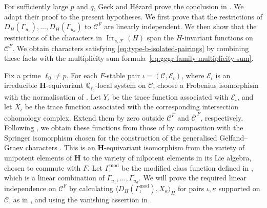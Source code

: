 \documentclass[10pt]{amsart}
\theoremstyle{definition}
\let\oldendproof\endproof
\renewenvironment{proof}[1][\proofname]{%
  \oldproof[\bfseries #1]%
}{\oldendproof}
\DeclareMathOperator{\Irr}{Irr}
\numberwithin{equation}{section}
\numberwithin{table}{section}
\begin{document}
\begin{proof}[Proof of Lemma~\ref{lem:type-b-isolated-coverage}]
For sufficiently large $p$ and $q$, Geck and H\'ezard prove the
conclusion in \cite[Proposition~4.3]{GeckHezard2008}. We adapt their
proof to the present hypotheses.
We first prove that the restrictions of
$D_H(\Gamma_{u_1}),\ldots,D_H(\Gamma_{u_d})$ to $\mathcal C^F$
are linearly independent. We then show that the restrictions of the
characters in $\Irr_{s,\mathcal F}(H)$ span the $H$-invariant
functions on $\mathcal C^F$. We obtain characters satisfying
\eqref{eq:type-b-isolated-pairings} by combining these facts with the
multiplicity sum formula~\eqref{eq:gggr-family-multiplicity-sum}.

Fix a prime $\ell_0\ne p$. For each $F$-stable pair
$\iota=(\mathcal C,\mathscr E_\iota)$, where $\mathscr E_\iota$ is an
irreducible $\mathbf H$-equivariant $\overline{\mathbb Q}_{\ell_0}$-local
system on $\mathcal C$, choose a Frobenius isomorphism with the
normalisation of \cite[10.1--10.8]{Taylor2016}.
Let $Y_\iota$ be the trace function associated with $\mathscr E_\iota$,
and let $X_\iota$ be the trace function associated with the corresponding
intersection cohomology complex. Extend them by zero outside
$\mathcal C^F$ and $\overline{\mathcal C}^{\,F}$, respectively.
Following \cite[11.12]{Taylor2016}, we obtain these functions from those
of \cite[10.8]{Taylor2016} by composition with the Springer isomorphism
chosen for the construction of the generalised Gelfand--Graev characters
\cite[Proposition~4.6 and Section~5]{Taylor2016}.
This is an $\mathbf H$-equivariant isomorphism from the variety of
unipotent elements of $\mathbf H$ to the variety of nilpotent elements
in its Lie algebra, chosen to commute with $F$.
Let $\Gamma_\iota^{\mathrm{mod}}$ be the modified class function defined in
\cite[(11.15)]{Taylor2016}, which is a linear combination of
$\Gamma_{u_1},\ldots,\Gamma_{u_d}$. We will prove the required linear
independence on $\mathcal C^F$ by calculating
$\langle D_H(\Gamma_\iota^{\mathrm{mod}}),X_\kappa\rangle_H$
for pairs $\iota,\kappa$ supported on $\mathcal C$, as in
\cite[Lemma~3.5]{Geck1994BasicIII}, and using the vanishing assertion in
\cite[Corollary~3.6(b)]{Geck1994BasicIII}.


\end{proof}
\end{document}
